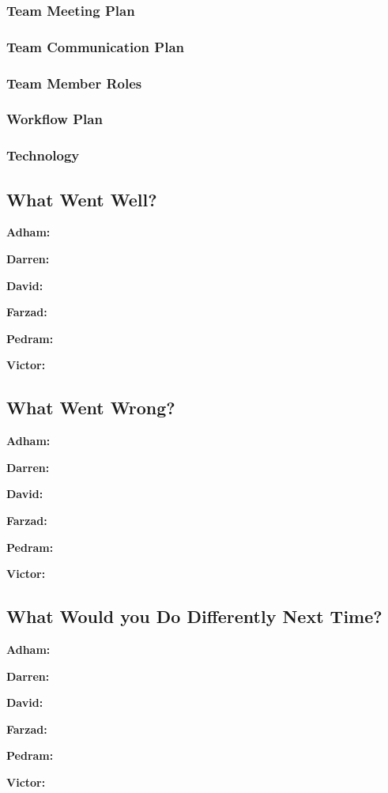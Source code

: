 \documentclass{article}
\begin{document}
\subsubsection{Team Meeting Plan}

\subsubsection{Team Communication Plan}

\subsubsection{Team Member Roles}

\subsubsection{Workflow Plan}

\subsubsection{Technology}

\subsection{What Went Well?}

\textbf{Adham:}

\textbf{Darren:}

\textbf{David:}

\textbf{Farzad:}

\textbf{Pedram:}

\textbf{Victor:} 

\subsection{What Went Wrong?}

\textbf{Adham:}

\textbf{Darren:}

\textbf{David:}

\textbf{Farzad:}

\textbf{Pedram:}

\textbf{Victor:} 

\subsection{What Would you Do Differently Next Time?}

\textbf{Adham:}

\textbf{Darren:}

\textbf{David:}

\textbf{Farzad:}

\textbf{Pedram:}

\textbf{Victor:} 
\end{document}
